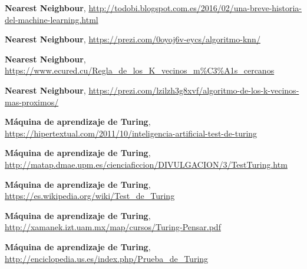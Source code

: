\documentclass[a4paper, 11pt]{article} %
\begin{document}
\begin{thebibliography}{9}
 	\textbf{Nearest Neighbour},
 \url{http://todobi.blogspot.com.es/2016/02/una-breve-historia-del-machine-learning.html}
 
 	\textbf{Nearest Neighbour},
 \url{https://prezi.com/0oyoj6v-eycs/algoritmo-knn/}
 
 	\textbf{Nearest Neighbour},
 \url{https://www.ecured.cu/Regla_de_los_K_vecinos_m%C3%A1s_cercanos}
 
 	\textbf{Nearest Neighbour},
 \url{https://prezi.com/lzilzh3g8xvf/algoritmo-de-los-k-vecinos-mas-proximos/}
 
 	\textbf{Máquina de aprendizaje de Turing},
 \url{https://hipertextual.com/2011/10/inteligencia-artificial-test-de-turing}
 
 	\textbf{Máquina de aprendizaje de Turing},
 \url{http://matap.dmae.upm.es/cienciaficcion/DIVULGACION/3/TestTuring.htm}
 
 	\textbf{Máquina de aprendizaje de Turing},
 \url{https://es.wikipedia.org/wiki/Test_de_Turing}
 
 	\textbf{Máquina de aprendizaje de Turing},
 \url{http://xamanek.izt.uam.mx/map/cursos/Turing-Pensar.pdf}
 
 	\textbf{Máquina de aprendizaje de Turing},
 \url{http://enciclopedia.us.es/index.php/Prueba_de_Turing}
 
    
\end{thebibliography}
\end{document}
